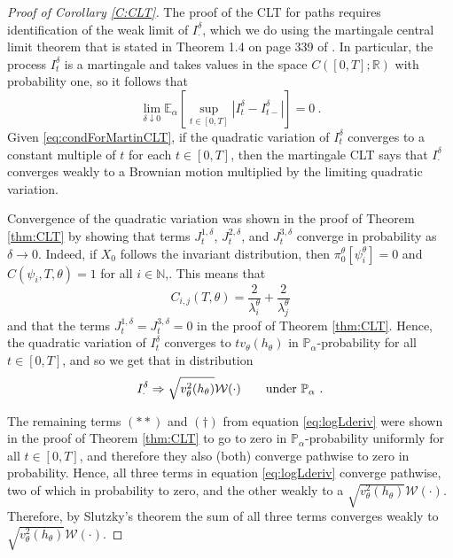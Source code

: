 \documentclass{article}
\begin{document}
\begin{proof}[Proof of Corollary \ref{C:CLT}]
The proof of the CLT for paths requires identification of the weak limit of $I_\cdot^{\delta}$, which we do using the martingale central limit theorem that is stated in Theorem 1.4 on page 339 of \cite{EthierKurtz1986}. In particular, the process $I_t^\delta$ is a martingale and takes values in the space $C([0,T];\mathbb R)$ with probability one, so it follows that
\begin{equation}
\label{eq:condForMartinCLT}\lim_{\delta\downarrow0}\mathbb E_\alpha\left[\sup_{t\in[0,T]}\left|I_t^\delta-I_{t-}^\delta\right|\right] = 0\ .
\end{equation}
Given \eqref{eq:condForMartinCLT}, if the quadratic variation of $I^\delta_{t}$ converges to a constant multiple of $t$ for each $t\in[0,T]$, then the martingale CLT says that $I_\cdot^\delta$ converges weakly to a Brownian motion multiplied by the limiting quadratic variation.

Convergence of the quadratic variation was shown in the proof of Theorem \ref{thm:CLT} by showing that terms $J_t^{1,\delta}$, $J_t^{2,\delta}$, and $J_t^{3,\delta}$ converge in probability as $\delta\rightarrow 0$. Indeed, if $X_{0}$ follows the invariant distribution, then $\pi_0^{\theta}[\psi_i^{\theta}]=0$ and $C(\psi_{i},T,\theta)=1$ for all $i\in\mathbb{N}$,. This means that
\[
C_{i,j}(T,\theta)=\frac{2}{\lambda_i^{\theta}}+\frac{2}{\lambda_j^{\theta}}
\]
and that the terms $J^{1,\delta}_{t}=J^{3,\delta}_{t}=0$ in the proof of Theorem \ref{thm:CLT}. Hence, the quadratic variation of $I_t^\delta$ converges to $tv_\theta(h_\theta)$ in $\mathbb P_\alpha$-probability for all $t\in [0,T]$, and so we get that in distribution
\begin{equation}
I^{\delta}_{\cdot}\Rightarrow  \sqrt{v^{2}_{\theta}(h_{\theta})}\mathcal{W}(\cdot)\qquad\hbox{under $\mathbb P_\alpha$}\ .
\end{equation}

The remaining terms $(**)$ and $(\dagger)$ from equation \eqref{eq:logLderiv} were shown in the proof of Theorem \ref{thm:CLT} to go to zero in $\mathbb P_\alpha$-probability
uniformly for all $t\in[0,T]$, and therefore they also (both) converge pathwise to zero in probability. Hence, all three terms in equation \eqref{eq:logLderiv} converge pathwise,
two of which in probability to zero, and the other weakly to a $\sqrt{v_\theta^2(h_\theta)}\mathcal W(\cdot)$. Therefore, by Slutzky's theorem the sum of all three terms converges
weakly to $\sqrt{v_\theta^2(h_\theta)}\mathcal W(\cdot)$.
\end{proof}
\end{document}

